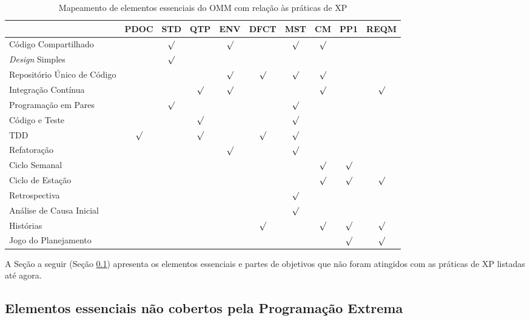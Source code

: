 \begin{table}
  \begin{tabular}{|p{4cm}|c|c|c|c|c|c|c|c|c|}
    \hline
    & PDOC & STD & QTP & ENV & DFCT & MST & CM & PP1 & REQM \\
    \hline
    Código Compartilhado & & $\surd$ & & $\surd$ & & $\surd$ & $\surd$ & & \\
    \hline
   \textit{Design} Simples & & $\surd$ & & & & & & & \\
    \hline
    Repositório Único de Código & & & & $\surd$ & $\surd$ & $\surd$ & $\surd$ & & \\
    \hline
    Integração Contínua & & & $\surd$ & $\surd$ & & & $\surd$ & & $\surd$ \\
    \hline
    Programação em Pares & & $\surd$ & & & & $\surd$ & & & \\
    \hline
    Código e Teste & & & $\surd$ & & & $\surd$ & & & \\
    \hline
    TDD & $\surd$ & & $\surd$ & & $\surd$ & $\surd$ & & & \\
    \hline
    Refatoração & & & & $\surd$ & & $\surd$ & & & \\
    \hline
    Ciclo Semanal & & & & & & & $\surd$ & $\surd$ & \\
    \hline
    Ciclo de Estação & & & & & & & $\surd$ & $\surd$ & $\surd$ \\
    \hline
    Retrospectiva & & & & & & $\surd$ & & & \\
    \hline
    Análise de Causa Inicial & & & & & & $\surd$ & & & \\
    \hline
    Histórias & & & & & $\surd$ & & $\surd$ & $\surd$ & $\surd$ \\
    \hline
    Jogo do Planejamento & & & & & & & & $\surd$ & $\surd$ \\
    \hline
  \end{tabular}
  \caption{Mapeamento de elementos essenciais do OMM com relação às práticas de XP}
  \label{tab:omm-by-xp}
\end{table}

A Seção a seguir (Seção \ref{sec:xp-omm}) apresenta os elementos
essenciais e partes de objetivos que não foram atingidos com as
práticas de XP listadas até agora.

\subsection{Elementos essenciais não cobertos pela Programação
  Extrema}
\label{sec:xp-omm}

